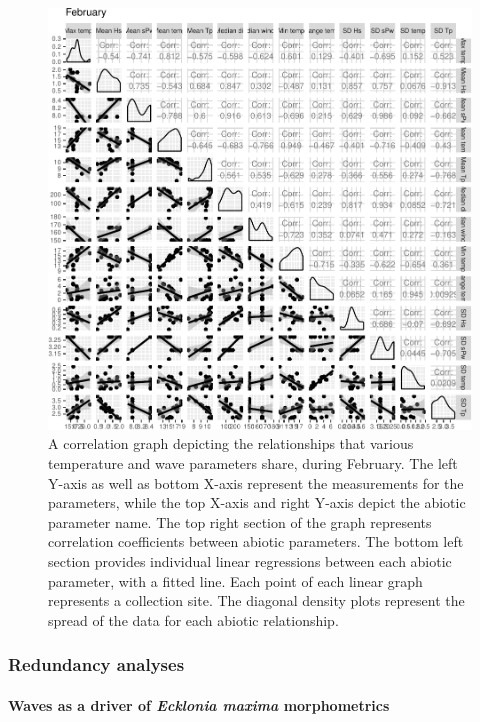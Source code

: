 \documentclass[10pt,a4,]{article}
\makeatletter
\def\maxwidth{\ifdim\Gin@nat@width>\linewidth\linewidth
\else\Gin@nat@width\fi}
\let\Oldincludegraphics\includegraphics
\renewcommand{\includegraphics}[1]{\Oldincludegraphics[width=\maxwidth]{#1}}
\makeatother
\begin{document}
\begin{figure}
\centering
\includegraphics{chapter_2_files/figure-latex/unnamed-chunk-23-1.pdf}
\caption{A correlation graph depicting the relationships that various
temperature and wave parameters share, during February. The left Y-axis
as well as bottom X-axis represent the measurements for the parameters,
while the top X-axis and right Y-axis depict the abiotic parameter name.
The top right section of the graph represents correlation coefficients
between abiotic parameters. The bottom left section provides individual
linear regressions between each abiotic parameter, with a fitted line.
Each point of each linear graph represents a collection site. The
diagonal density plots represent the spread of the data for each abiotic
relationship.}
\end{figure}

\hypertarget{redundancy-analyses}{%
\subsubsection{Redundancy analyses}\label{redundancy-analyses}}

\hypertarget{waves-as-a-driver-of-ecklonia-maxima-morphometrics}{%
\paragraph{\texorpdfstring{Waves as a driver of \emph{Ecklonia maxima}
morphometrics}{Waves as a driver of Ecklonia maxima morphometrics}}\label{waves-as-a-driver-of-ecklonia-maxima-morphometrics}}
\end{document}
